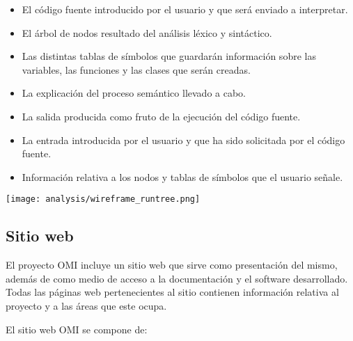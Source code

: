 \begin{itemize}
\item El código fuente introducido por el usuario y que será enviado a interpretar. \\
\item El árbol de nodos resultado del análisis léxico y sintáctico. \\
\item Las distintas tablas de símbolos que guardarán información sobre las variables, las funciones y las clases que serán creadas. \\
\item La explicación del proceso semántico llevado a cabo.  \\
\item La salida producida como fruto de la ejecución del código fuente. \\
\item La entrada introducida por el usuario y que ha sido solicitada por el código fuente. \\
\item Información relativa a los nodos y tablas de símbolos que el usuario señale.
\end{itemize} 

\begin{center}
\texttt{[image: analysis/wireframe\_runtree.png]} 
\end{center}

\subsection{Sitio web}
El proyecto OMI incluye un sitio web que sirve como presentación del mismo, además de como medio de acceso a la documentación 
y el software desarrollado. Todas las páginas web pertenecientes al sitio contienen información relativa al proyecto y a las áreas que este
ocupa. 

\pagebreak

El sitio web OMI se compone de: 

